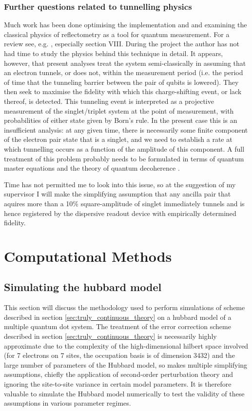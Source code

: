 \documentclass{report}
\begin{document}
\subsection{Further questions related to tunnelling physics} \label{sec:tunneling_question}

Much work has been done optimising the implementation and and examining the classical physics of reflectometry as a tool for quantum measurement. For a review see, e.g. \cite{Vigneau2023}, especially section VIII. During the project the author has not had time to study the physics behind this technique in detail. It appears, however, that present analyses treat the system semi-classically in assuming that an electron tunnels, or does not, within the measurement period (i.e. the period of time that the tunneling barrier between the pair of qubits is lowered). They then seek to maximise the fidelity with which this charge-shifting event, or lack thereof, is detected. This tunneling event is interpreted as a projective measurement of the singlet/triplet system at the point of measurement, with probabilities of either state given by Born's rule. In the present case this is an insufficient analysis: at any given time, there is necessarily some finite component of the electron pair state that is a singlet, and we need to establish a rate at which tunnelling occurs as a function of the amplitude of this component. A full treatment of this problem probably needs to be formulated in terms of quantum master equations and the theory of quantum decoherence \cite{Wiseman1996}.

Time has not permitted me to look into this issue, so at the suggestion of my supervisor I will make the simplifying assumption that any ancilla pair that aquires more than a 10\% square-amplitude of singlet immediately tunnels and is hence registered by the dispersive readout device with empirically determined fidelity.

\chapter{Computational Methods} \label{chap:methods}

\section{Simulating the hubbard model}
This section will discuss the methodology used to perform simulations of scheme described in section \ref{sec:truly_continuous_theory} on a hubbard model of a multiple quantum dot system. The treatment of the error correction scheme described in section \ref{sec:truly_continuous_theory} is necessarily highly approximate due to the complexity of the high-dimensional hilbert space involved (for 7 electrons on 7 sites, the occupation basis is of dimension 3432) and the large number of parameters of the Hubbard model, so makes multiple simplifying assumptions, chiefly the application of second-order perturbation theory and ignoring the site-to-site variance in certain model parameters. It is therefore valuable to simulate the Hubbard model numerically to test the validity of these assumptions in various parameter regimes.
\end{document}
